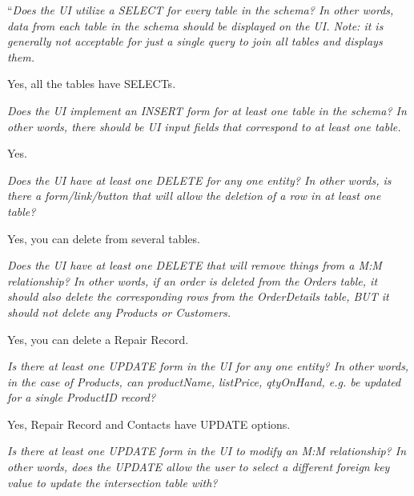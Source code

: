 \documentclass{article}
\begin{document}
\vspace{0.5cm}
\begin{tcolorbox}[colback=secondarycolor, colframe=primarycolor, title=\textbf{Step 3: Peer Review 1 - Scott Dispensa}]
``\textit{Does the UI utilize a SELECT for every table in the schema? In other words, data from each table in the schema should be displayed on the UI. Note: it is generally not acceptable for just a single query to join all tables and displays them.}

\vspace{0.05cm}
 Yes, all the tables have SELECTs.

\vspace{0.2cm}
\textit{Does the UI implement an INSERT form for at least one table in the schema? In other words, there should be UI input fields that correspond to at least one table.}

\vspace{0.05cm}
 Yes.

\vspace{0.2cm}
\textit{Does the UI have at least one DELETE for any one entity? In other words, is there a form/link/button that will allow the deletion of a row in at least one table?}

\vspace{0.05cm}
Yes, you can delete from several tables.

\vspace{0.2cm}
\textit{Does the UI have at least one DELETE that will remove things from a M:M relationship? In other words, if an order is deleted from the Orders table, it should also delete the corresponding rows from the OrderDetails table, BUT it should not delete any Products or Customers.}

\vspace{0.05cm}
Yes, you can delete a Repair Record.

\vspace{0.2cm}
\textit{Is there at least one UPDATE form in the UI for any one entity? In other words, in the case of Products, can productName, listPrice, qtyOnHand, e.g. be updated for a single ProductID record?}

\vspace{0.05cm}
Yes, Repair Record and Contacts have UPDATE options.

\vspace{0.2cm}
\textit{Is there at least one UPDATE form in the UI to modify an M:M relationship? In other words, does the UPDATE allow the user to select a different foreign key value to update the intersection table with?}


\end{tcolorbox}
\end{document}
